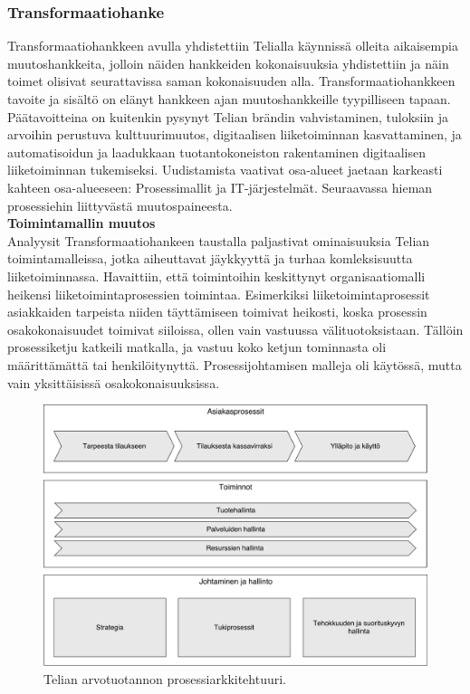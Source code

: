 \documentclass[finnish,12pt,a4paper,pdftex]{article}
\begin{document}
\subsubsection{Transformaatiohanke}

Transformaatiohankkeen avulla yhdistettiin Telialla käynnissä olleita aikaisempia muutoshankkeita, jolloin näiden hankkeiden kokonaisuuksia yhdistettiin ja näin toimet olisivat seurattavissa saman kokonaisuuden alla. Transformaatiohankkeen tavoite ja sisältö on elänyt hankkeen ajan muutoshankkeille tyypilliseen tapaan. Päätavoitteina on kuitenkin pysynyt Telian brändin vahvistaminen, tuloksiin ja arvoihin perustuva kulttuurimuutos, digitaalisen liiketoiminnan kasvattaminen, ja automatisoidun ja laadukkaan tuotantokoneiston rakentaminen digitaalisen liiketoiminnan tukemiseksi. Uudistamista vaativat osa-alueet jaetaan karkeasti kahteen osa-alueeseen: Prosessimallit ja IT-järjestelmät. Seuraavassa hieman prosessiehin liittyvästä muutospaineesta.\\

\textbf{Toimintamallin muutos}\\

Analyysit Transformaatiohankeen taustalla paljastivat ominaisuuksia Telian toimintamalleissa, jotka aiheuttavat jäykkyyttä ja turhaa komleksisuutta liiketoiminnassa. Havaittiin, että toimintoihin keskittynyt organisaatiomalli heikensi liiketoimintaprosessien toimintaa. Esimerkiksi liiketoimintaprosessit asiakkaiden tarpeista niiden täyttämiseen toimivat heikosti, koska prosessin osakokonaisuudet toimivat siiloissa, ollen vain vastuussa välituotoksistaan. Tällöin prosessiketju katkeili matkalla, ja vastuu koko ketjun tominnasta oli määrittämättä tai henkilöitynyttä. Prosessijohtamisen malleja oli käytössä, mutta vain yksittäisissä osakokonaisuuksissa.\\

\begin{figure}[!h]
    \centering
    \includegraphics[scale=0.4]{images/prosessiarkkitehtuuri.pdf}
    \caption{Telian arvotuotannon prosessiarkkitehtuuri.}
    \label{fig:prosark}
\end{figure}
\end{document}
